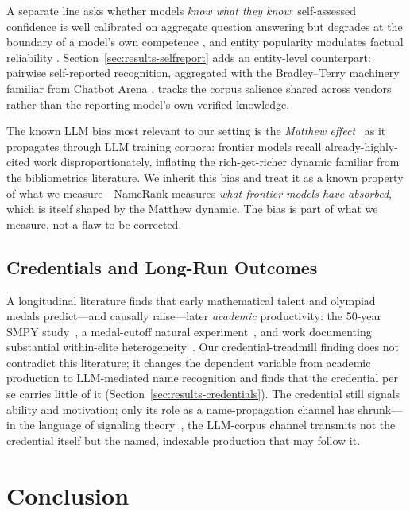 \documentclass[11pt]{article}
\begin{document}
A separate line asks whether models \emph{know what they know}: self-assessed confidence is well calibrated on aggregate question answering \citep{kadavath2022language} but degrades at the boundary of a model's own competence \citep{yin2023selfaware}, and entity popularity modulates factual reliability \citep{mallen2023trust}. Section~\ref{sec:results-selfreport} adds an entity-level counterpart: pairwise self-reported recognition, aggregated with the Bradley--Terry machinery familiar from Chatbot Arena \citep{chiang2024chatbot}, tracks the corpus salience shared across vendors rather than the reporting model's own verified knowledge.

The known LLM bias most relevant to our setting is the \emph{Matthew effect}~\citep{merton1968matthew} as it propagates through LLM training corpora: frontier models recall already-highly-cited work disproportionately, inflating the rich-get-richer dynamic familiar from the bibliometrics literature. We inherit this bias and treat it as a known property of what we measure---NameRank measures \emph{what frontier models have absorbed}, which is itself shaped by the Matthew dynamic. The bias is part of what we measure, not a flaw to be corrected.

\subsection{Credentials and Long-Run Outcomes}

A longitudinal literature finds that early mathematical talent and olympiad medals predict---and causally raise---later \emph{academic} productivity: the 50-year SMPY study~\citep{smpy2020}, a medal-cutoff natural experiment~\citep{agarwalGaule2020}, and work documenting substantial within-elite heterogeneity~\citep{guellich2025}. Our credential-treadmill finding does not contradict this literature; it changes the dependent variable from academic production to LLM-mediated name recognition and finds that the credential per se carries little of it (Section~\ref{sec:results-credentials}). The credential still signals ability and motivation; only its role as a name-propagation channel has shrunk---in the language of signaling theory~\citep{spence1973}, the LLM-corpus channel transmits not the credential itself but the named, indexable production that may follow it.

\section{Conclusion}
\label{sec:conclusion}
\end{document}
